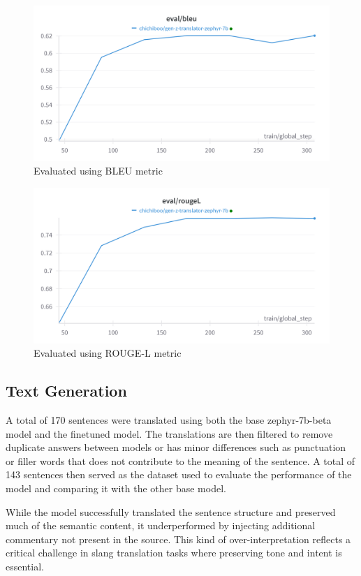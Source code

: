 \begin{figure}[!htbp]
	\centering
	\includegraphics[scale=0.2]{figures/BLEUEvaluation.png}
	\caption{Evaluated using BLEU metric}
	\label{fig:bleu_eval}
\end{figure}
\begin{figure}[!htbp]
	\centering
	\includegraphics[scale=0.2]{figures/ROUGELEvaluation.png}
	\caption{Evaluated using ROUGE-L metric}
	\label{fig:rouge_eval}
\end{figure}
\FloatBarrier
\subsection{Text Generation}
A total of 170 sentences were translated using both the base zephyr-7b-beta model and the finetuned model. The translations are then filtered to remove duplicate answers between models or has minor differences such as punctuation or filler words that does not contribute to the meaning of the sentence. A total of 143 sentences then served as the dataset used to evaluate the performance of the model and comparing it with the other base model.

While the model successfully translated the sentence structure and preserved much of the semantic content, it underperformed by injecting additional commentary not present in the source. This kind of over-interpretation reflects a critical challenge in slang translation tasks where preserving tone and intent is essential.

